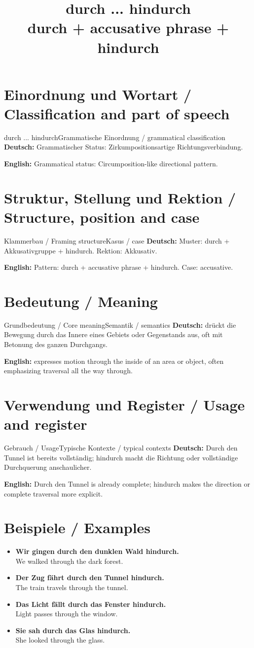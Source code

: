 \documentclass[a4paper,11pt]{article}
\title{durch ... hindurch\\ \large durch + accusative phrase + hindurch}
\date{}
\newcommand{\GermanText}[1]{\textbf{Deutsch: }#1\par}
\newcommand{\EnglishText}[1]{{\small\color{SoftGray}\textbf{English: }#1\par}}
\newcommand{\ExampleItem}[2]{\item \textbf{#1}\\{\small\color{SoftGray}#2}}
\begin{document}
\maketitle
\tableofcontents
\newpage
\section{Einordnung und Wortart / Classification and part of speech}
\begin{grammarentry}{durch ... hindurch}{Grammatische Einordnung / grammatical classification}
\GermanText{Grammatischer Status: Zirkumpositionsartige Richtungsverbindung.}
\EnglishText{Grammatical status: Circumposition-like directional pattern.}
\end{grammarentry}
\section{Struktur, Stellung und Rektion / Structure, position and case}
\begin{grammarentry}{Klammerbau / Framing structure}{Kasus / case}
\GermanText{Muster: durch + Akkusativgruppe + hindurch. Rektion: Akkusativ.}
\EnglishText{Pattern: durch + accusative phrase + hindurch. Case: accusative.}
\end{grammarentry}
\section{Bedeutung / Meaning}
\begin{grammarentry}{Grundbedeutung / Core meaning}{Semantik / semantics}
\GermanText{drückt die Bewegung durch das Innere eines Gebiets oder Gegenstands aus, oft mit Betonung des ganzen Durchgangs.}
\EnglishText{expresses motion through the inside of an area or object, often emphasizing traversal all the way through.}
\end{grammarentry}
\section{Verwendung und Register / Usage and register}
\begin{grammarentry}{Gebrauch / Usage}{Typische Kontexte / typical contexts}
\GermanText{Durch den Tunnel ist bereits vollständig; hindurch macht die Richtung oder vollständige Durchquerung anschaulicher.}
\EnglishText{Durch den Tunnel is already complete; hindurch makes the direction or complete traversal more explicit.}
\end{grammarentry}
\section{Beispiele / Examples}
\begin{exbox}
\begin{itemize}
\ExampleItem{Wir gingen durch den dunklen Wald hindurch.}{We walked through the dark forest.}
\ExampleItem{Der Zug fährt durch den Tunnel hindurch.}{The train travels through the tunnel.}
\ExampleItem{Das Licht fällt durch das Fenster hindurch.}{Light passes through the window.}
\ExampleItem{Sie sah durch das Glas hindurch.}{She looked through the glass.}
\end{itemize}
\end{exbox}
\end{document}
